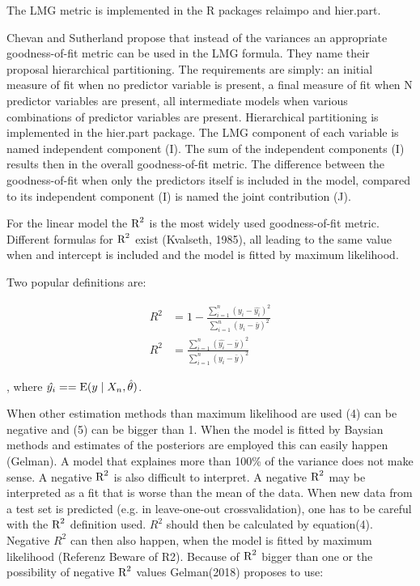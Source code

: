 \documentclass[11pt,a4paper,twoside]{book}\usepackage[]{graphicx}\usepackage[]{color}
\begin{document}
The LMG metric is implemented in the R packages relaimpo and hier.part.

Chevan and Sutherland propose that instead of the variances an appropriate goodness-of-fit metric can be used in the LMG formula. They name their proposal hierarchical partitioning. The requirements are simply: an initial measure of fit when no predictor variable is present, a final measure of fit when N predictor variables are present, all intermediate models when various combinations of predictor variables are present. 
Hierarchical partitioning is implemented in the hier.part package. The LMG component of each variable is named independent component (I). The sum of the independent components (I) results then in the overall goodness-of-fit metric. The difference between the goodness-of-fit when only the predictors itself is included in the model, compared to its independent component (I) is named the joint contribution (J).  

For the linear model the $\text{R}^2$ is the most widely used goodness-of-fit metric. Different formulas for $\text{R}^2$ exist (Kvalseth, 1985), all leading to the same value when and intercept is included and the model is fitted by maximum likelihood. 

Two popular definitions are:
   
      \begin{align} 
     R^2 &= 1 - \frac{\sum_{i=1}^{n}(y_{i} - \hat{y_{i}})^2}{\sum_{i=1}^{n}(y_{i}-\bar{y})^2}   \label{eq:4}  \\
     R^2 &= \frac{\sum_{i=1}^{n}(\hat{y_{i}} - \bar{y})^2}{\sum_{i=1}^{n}(y_{i}-\bar{y})^2}   \label{eq:5} 
   \end{align} 
   
, where $\hat{y_{i}} = = \operatorname{E} ({y \mid X_{n}, \hat{\theta}})$.  

When other estimation methods than maximum likelihood are used (4) can be negative and (5) can be bigger than 1. When the model is fitted by Baysian methods and estimates of the posteriors are employed this can easily happen (Gelman). A model that explaines more than 100\% of the variance does not make sense. A negative $\text{R}^2$ is also difficult to interpret. A negative $\text{R}^2$ may be interpreted as a fit that is worse than the mean of the data. When new data from a test set is predicted (e.g. in leave-one-out crossvalidation), one has to be careful with the $\text{R}^2$ definition used. $R^2$ should then be calculated by equation(4). Negative $R^2$ can then also happen, when the model is fitted by maximum likelihood (Referenz Beware of R2).  Because of $\text{R}^2$ bigger than one or the possibility of negative $\text{R}^2$ values Gelman(2018) proposes to use:
\end{document}
